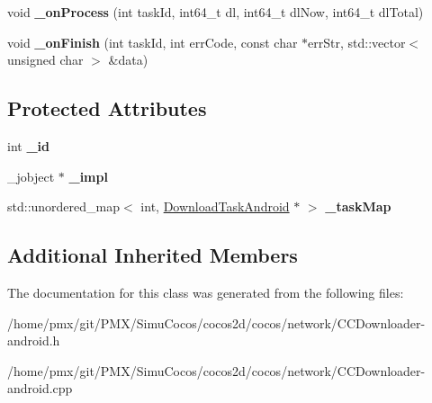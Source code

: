 \begin{DoxyCompactItemize}
\item 
\mbox{\label{classcocos2d_1_1network_1_1DownloaderAndroid_af201a8862f25a387915ebcfb6e9c19af}} 
void {\bfseries \+\_\+on\+Process} (int task\+Id, int64\+\_\+t dl, int64\+\_\+t dl\+Now, int64\+\_\+t dl\+Total)
\item 
\mbox{\label{classcocos2d_1_1network_1_1DownloaderAndroid_a7f35d9d69f0f615a631e519bed460a51}} 
void {\bfseries \+\_\+on\+Finish} (int task\+Id, int err\+Code, const char $\ast$err\+Str, std\+::vector$<$ unsigned char $>$ \&data)
\end{DoxyCompactItemize}
\subsection*{Protected Attributes}
\begin{DoxyCompactItemize}
\item 
\mbox{\label{classcocos2d_1_1network_1_1DownloaderAndroid_a8910e5b35f9cda8d482b6a61396f5a07}} 
int {\bfseries \+\_\+id}
\item 
\mbox{\label{classcocos2d_1_1network_1_1DownloaderAndroid_a365bee773e67ff7599ec64d703107ef3}} 
\+\_\+jobject $\ast$ {\bfseries \+\_\+impl}
\item 
\mbox{\label{classcocos2d_1_1network_1_1DownloaderAndroid_ac562c053bad0dd0510b63f7a02596450}} 
std\+::unordered\+\_\+map$<$ int, \hyperlink{structcocos2d_1_1network_1_1DownloadTaskAndroid}{Download\+Task\+Android} $\ast$ $>$ {\bfseries \+\_\+task\+Map}
\end{DoxyCompactItemize}
\subsection*{Additional Inherited Members}


The documentation for this class was generated from the following files\+:\begin{DoxyCompactItemize}
\item 
/home/pmx/git/\+P\+M\+X/\+Simu\+Cocos/cocos2d/cocos/network/C\+C\+Downloader-\/android.\+h\item 
/home/pmx/git/\+P\+M\+X/\+Simu\+Cocos/cocos2d/cocos/network/C\+C\+Downloader-\/android.\+cpp\end{DoxyCompactItemize}
